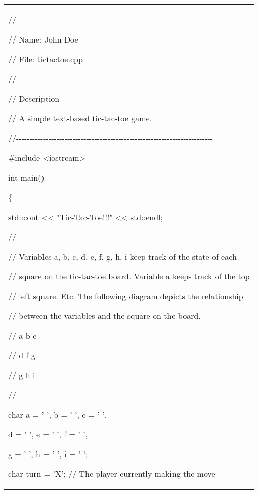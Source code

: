 \documentclass[
]{article}
\begin{document}
\begin{longtable}[]{@{}l@{}}
\toprule
\endhead
\begin{minipage}[t]{0.97\columnwidth}\raggedright
//-\/-\/-\/-\/-\/-\/-\/-\/-\/-\/-\/-\/-\/-\/-\/-\/-\/-\/-\/-\/-\/-\/-\/-\/-\/-\/-\/-\/-\/-\/-\/-\/-\/-\/-\/-\/-\/-\/-\/-\/-\/-\/-\/-\/-\/-\/-\/-\/-\/-\/-\/-\/-\/-\/-\/-\/-\/-\/-\/-\/-\/-\/-\/-\/-\/-\/-\/-\/-\/-\/-\/-\/-

// Name: John Doe

// File: tictactoe.cpp

//

// Description

// A simple text-based tic-tac-toe game.

//-\/-\/-\/-\/-\/-\/-\/-\/-\/-\/-\/-\/-\/-\/-\/-\/-\/-\/-\/-\/-\/-\/-\/-\/-\/-\/-\/-\/-\/-\/-\/-\/-\/-\/-\/-\/-\/-\/-\/-\/-\/-\/-\/-\/-\/-\/-\/-\/-\/-\/-\/-\/-\/-\/-\/-\/-\/-\/-\/-\/-\/-\/-\/-\/-\/-\/-\/-\/-\/-\/-\/-\/-

\#include \textless iostream\textgreater{}

int main()

\{

std::cout \textless\textless{} "Tic-Tac-Toe!!!" \textless\textless{}
std::endl;

//-\/-\/-\/-\/-\/-\/-\/-\/-\/-\/-\/-\/-\/-\/-\/-\/-\/-\/-\/-\/-\/-\/-\/-\/-\/-\/-\/-\/-\/-\/-\/-\/-\/-\/-\/-\/-\/-\/-\/-\/-\/-\/-\/-\/-\/-\/-\/-\/-\/-\/-\/-\/-\/-\/-\/-\/-\/-\/-\/-\/-\/-\/-\/-\/-\/-\/-\/-\/-

// Variables a, b, c, d, e, f, g, h, i keep track of the state of each

// square on the tic-tac-toe board. Variable a keeps track of the top

// left square. Etc. The following diagram depicts the relationship

// between the variables and the square on the board.

// a b c

// d f g

// g h i

//-\/-\/-\/-\/-\/-\/-\/-\/-\/-\/-\/-\/-\/-\/-\/-\/-\/-\/-\/-\/-\/-\/-\/-\/-\/-\/-\/-\/-\/-\/-\/-\/-\/-\/-\/-\/-\/-\/-\/-\/-\/-\/-\/-\/-\/-\/-\/-\/-\/-\/-\/-\/-\/-\/-\/-\/-\/-\/-\/-\/-\/-\/-\/-\/-\/-\/-\/-\/-

char a = ' ', b = ' ', c = ' ',

d = ' ', e = ' ', f = ' ',

g = ' ', h = ' ', i = ' ';

char turn = 'X'; // The player currently making the move


\end{minipage}
\end{longtable}
\end{document}
